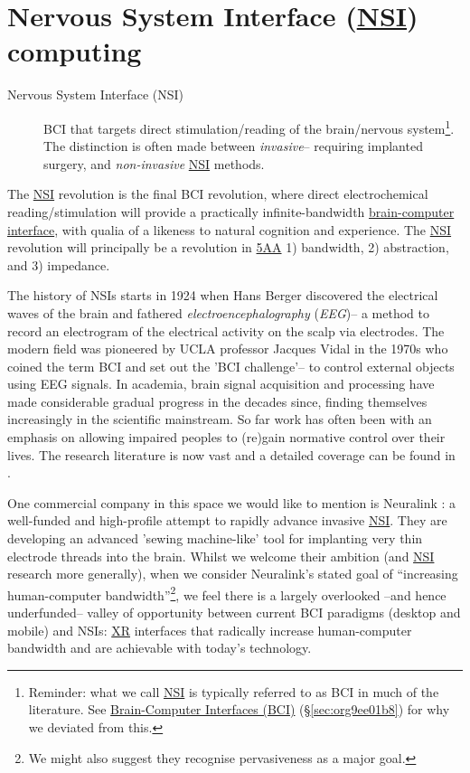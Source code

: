 \documentclass[logo,bsc,singlespacing,parskip]{infthesis}
\begin{document}
\section{Nervous System Interface (\hyperref[orgf403bf3]{NSI}) computing}
\label{sec:org4b6c5db}
\begin{mdframed}
\begin{description}
\item[{Nervous System Interface (\label{orgf403bf3}NSI)}] BCI that targets direct stimulation/reading of the brain/nervous system\footnote{Reminder: what we call \hyperref[orgf403bf3]{NSI} is typically referred to as BCI in much of the literature. See \hyperref[sec:org9ee01b8]{Brain-Computer Interfaces (BCI)} (\S \ref{sec:org9ee01b8}) for why we deviated from this.}.
The distinction is often made between \emph{invasive}-- requiring implanted surgery, and \emph{non-invasive} \hyperref[orgf403bf3]{NSI} methods.
\end{description}
\end{mdframed}

The \hyperref[orgf403bf3]{NSI} revolution is the final BCI revolution, where direct electrochemical reading/stimulation will provide a practically infinite-bandwidth \hyperref[org75a7ab5]{brain-computer interface}, with qualia of a likeness to natural cognition and experience.
The \hyperref[orgf403bf3]{NSI} revolution will principally be a revolution in \hyperref[org2644eb5]{5AA} 1) bandwidth, 2) abstraction, and 3) impedance.

The history of NSIs starts in 1924 when Hans Berger discovered the electrical waves of the brain and fathered \emph{electroencephalography} (\emph{EEG})--  a method to record an electrogram of the electrical activity on the scalp via electrodes.
The modern field was pioneered by UCLA professor Jacques Vidal in the 1970s who coined the term BCI and set out the 'BCI challenge'-- to control external objects using EEG signals.
In academia, brain signal acquisition and processing have made considerable gradual progress in the decades since, finding themselves increasingly in the scientific mainstream.
So far work has often been with an emphasis on allowing impaired peoples to (re)gain normative control over their lives.
The research literature is now vast and a detailed coverage can be found in \autocite{kawala-sterniukSummaryFiftyYears2021}.

One commercial company in this space we would like to mention is Neuralink \autocite{muskNeuralink}: a well-funded and high-profile attempt to rapidly advance invasive \hyperref[orgf403bf3]{NSI}.
They are developing an advanced 'sewing machine-like' tool for implanting very thin electrode threads into the brain.
Whilst we welcome their ambition (and \hyperref[orgf403bf3]{NSI} research more generally), when we consider Neuralink's stated goal of ``increasing human-computer bandwidth''\footnote{We might also suggest they recognise pervasiveness as a major goal.}, we feel there is a largely overlooked --and hence underfunded-- valley of opportunity between current BCI paradigms (desktop and mobile) and NSIs: \hyperref[org39cbd51]{XR} interfaces that radically increase human-computer bandwidth and are achievable with today's technology.
\end{document}
